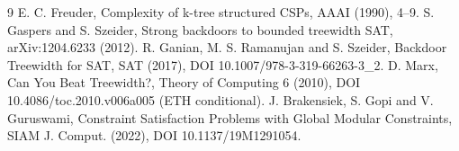 \documentclass[11pt]{article}
\begin{document}
\begin{thebibliography}{9}
 E. C. Freuder, Complexity of k-tree structured CSPs, AAAI (1990), 4--9.
 S. Gaspers and S. Szeider, Strong backdoors to bounded treewidth SAT, arXiv:1204.6233 (2012).
 R. Ganian, M. S. Ramanujan and S. Szeider, Backdoor Treewidth for SAT, SAT (2017), DOI 10.1007/978-3-319-66263-3\_2.
 D. Marx, Can You Beat Treewidth?, Theory of Computing 6 (2010), DOI 10.4086/toc.2010.v006a005 (ETH conditional).
 J. Brakensiek, S. Gopi and V. Guruswami, Constraint Satisfaction Problems with Global Modular Constraints, SIAM J. Comput. (2022), DOI 10.1137/19M1291054.
\end{thebibliography}
\end{document}
